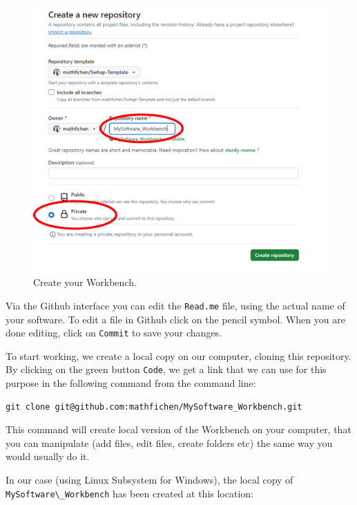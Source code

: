 \documentclass[]{article}
\newcommand{\passthrough}[1]{#1}
\begin{document}
\begin{figure}
\hypertarget{fig:createWorkbench}{%
\centering
\includegraphics{./media2/02_CreateWorkbench.png}
\caption{Create your Workbench.}\label{fig:createWorkbench}
}
\end{figure}

Via the Github interface you can edit the
\passthrough{\lstinline!Read.me!} file, using the actual name of your
software. To edit a file in Github click on the pencil symbol. When you
are done editing, click on \passthrough{\lstinline!Commit!} to save your
changes.

To start working, we create a local copy on our computer, cloning this
repository. By clicking on the green button
\passthrough{\lstinline!Code!}, we get a link that we can use for this
purpose in the following command from the command line:

\begin{lstlisting}
git clone git@github.com:mathfichen/MySoftware_Workbench.git
\end{lstlisting}

This command will create local version of the Workbench on your
computer, that you can manipulate (add files, edit files, create folders
etc) the same way you would usually do it.

In our case (using Linux Subsystem for Windows), the local copy of
\passthrough{\lstinline!MySoftware\_Workbench!} has been created at this
location:
\end{document}
